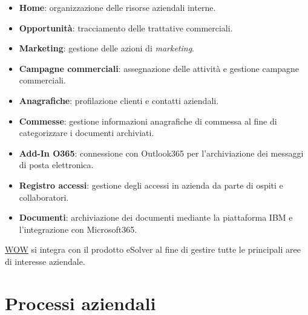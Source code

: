\begin{itemize}
    \item \textbf{Home}: organizzazione delle risorse aziendali interne. 
    \item \textbf{Opportunità}: tracciamento delle trattative commerciali. 
    \item \textbf{Marketing}: gestione delle azioni di \emph{marketing}. 
    \item \textbf{Campagne commerciali}: assegnazione delle attività e gestione campagne commerciali.
    \item \textbf{Anagrafiche}: profilazione clienti e contatti aziendali. 
    \item \textbf{Commesse}: gestione informazioni anagrafiche di commessa al fine di categorizzare i documenti archiviati.
    \item \textbf{Add-In O365}: connessione con Outlook365 per l'archiviazione dei messaggi di posta elettronica.
    \item \textbf{Registro accessi}: gestione degli accessi in azienda da parte di ospiti e collaboratori.
    \item \textbf{Documenti}: archiviazione dei documenti mediante la piattaforma IBM e l'integrazione con Microsoft365.\\
\end{itemize}
\hyperref[WOW]{WOW} si integra con il prodotto eSolver al fine di gestire tutte le principali aree di interesse aziendale.\\

\section{Processi aziendali}
